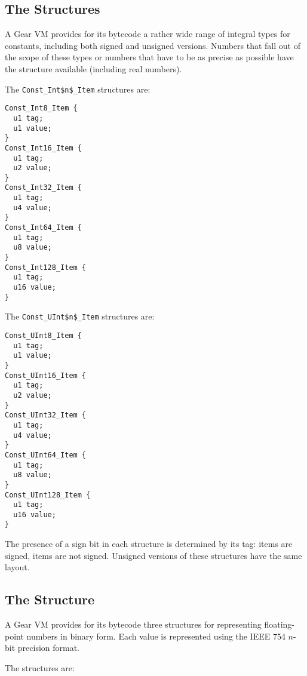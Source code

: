 \subsection{The  Structures}

A Gear VM provides for its bytecode a rather wide range of integral types for constants, including both signed and unsigned versions. Numbers that fall out of the scope of these types or numbers that have to be as precise as possible have the  structure available (including real numbers).

The \lstinline!Const_Int$n$_Item! structures are:

\begin{minipage}{\linewidth}
\begin{lstlisting}
Const_Int8_Item {
  u1 tag;
  u1 value;
}
Const_Int16_Item {
  u1 tag;
  u2 value;
}
Const_Int32_Item {
  u1 tag;
  u4 value;
}
Const_Int64_Item {
  u1 tag;
  u8 value;
}
Const_Int128_Item {
  u1 tag;
  u16 value;
}
\end{lstlisting}
\end{minipage}

The \lstinline!Const_UInt$n$_Item! structures are:

\begin{minipage}{\linewidth}
\begin{lstlisting}
Const_UInt8_Item {
  u1 tag;
  u1 value;
}
Const_UInt16_Item {
  u1 tag;
  u2 value;
}
Const_UInt32_Item {
  u1 tag;
  u4 value;
}
Const_UInt64_Item {
  u1 tag;
  u8 value;
}
Const_UInt128_Item {
  u1 tag;
  u16 value;
}
\end{lstlisting}
\end{minipage}

The presence of a sign bit in each structure is determined by its tag:  items are signed,  items are not signed. Unsigned versions of these structures have the same layout. 





\subsection{The  Structure}

A Gear VM provides for its bytecode three structures for representing floating-point numbers in binary form. Each value is represented using the IEEE 754 $n$-bit precision format. 

The  structures are:

